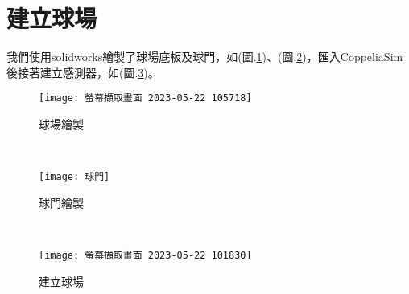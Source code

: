 \section{建立球場}
我們使用solidworks繪製了球場底板及球門，如(圖.\ref{球場繪製})、(圖.\ref{球門繪製})，匯入CoppeliaSim後接著建立感測器，如(圖.\ref{建立球場})。\
\begin{figure}[hbt!]
\begin{center}
\texttt{[image: 螢幕擷取畫面 2023-05-22 105718]}
\caption{\Large 球場繪製}\label{球場繪製}
\end{center}
\end{figure}\
\begin{figure}[hbt!]
\begin{center}
\texttt{[image: 球門]}
\caption{\Large 球門繪製}\label{球門繪製}
\end{center}
\end{figure}\
\begin{figure}[hbt!]
\begin{center}
\texttt{[image: 螢幕擷取畫面 2023-05-22 101830]}
\caption{\Large 建立球場}\label{建立球場}
\end{center}
\end{figure}\
\newpage

